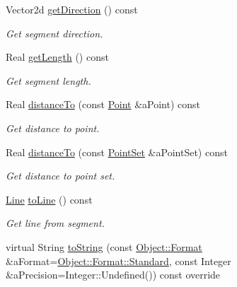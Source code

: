 \begin{DoxyCompactItemize}
Vector2d \hyperlink{classostk_1_1math_1_1geom_1_1d2_1_1objects_1_1_segment_a92754ce55fb91c186fbe06db876425f9}{get\+Direction} () const
\begin{DoxyCompactList}\small\item\em Get segment direction. \end{DoxyCompactList}\item 
Real \hyperlink{classostk_1_1math_1_1geom_1_1d2_1_1objects_1_1_segment_a9e6dcd2b0d921c755b6980f457ed7f3e}{get\+Length} () const
\begin{DoxyCompactList}\small\item\em Get segment length. \end{DoxyCompactList}\item 
Real \hyperlink{classostk_1_1math_1_1geom_1_1d2_1_1objects_1_1_segment_a86ccd1f27b77bb7bc08c6461ccdf67b4}{distance\+To} (const \hyperlink{classostk_1_1math_1_1geom_1_1d2_1_1objects_1_1_point}{Point} \&a\+Point) const
\begin{DoxyCompactList}\small\item\em Get distance to point. \end{DoxyCompactList}\item 
Real \hyperlink{classostk_1_1math_1_1geom_1_1d2_1_1objects_1_1_segment_ab1619a8228472bd21629ad889d8eec99}{distance\+To} (const \hyperlink{classostk_1_1math_1_1geom_1_1d2_1_1objects_1_1_point_set}{Point\+Set} \&a\+Point\+Set) const
\begin{DoxyCompactList}\small\item\em Get distance to point set. \end{DoxyCompactList}\item 
\hyperlink{classostk_1_1math_1_1geom_1_1d2_1_1objects_1_1_line}{Line} \hyperlink{classostk_1_1math_1_1geom_1_1d2_1_1objects_1_1_segment_a0a630cfcf9111d168924035d768dd38a}{to\+Line} () const
\begin{DoxyCompactList}\small\item\em Get line from segment. \end{DoxyCompactList}\item 
virtual String \hyperlink{classostk_1_1math_1_1geom_1_1d2_1_1objects_1_1_segment_ac302430065e10f1f281bb8782a904673}{to\+String} (const \hyperlink{classostk_1_1math_1_1geom_1_1d2_1_1_object_aa76f9e30caebf4005bafbdff447f66cf}{Object\+::\+Format} \&a\+Format=\hyperlink{classostk_1_1math_1_1geom_1_1d2_1_1_object_aa76f9e30caebf4005bafbdff447f66cfaeb6d8ae6f20283755b339c0dc273988b}{Object\+::\+Format\+::\+Standard}, const Integer \&a\+Precision=Integer\+::\+Undefined()) const override

\end{DoxyCompactItemize}
